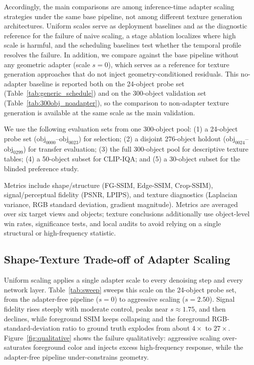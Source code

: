 \documentclass[times,twocolumn,final]{elsarticle}
\begin{document}
Accordingly, the main comparisons are among inference-time adapter scaling strategies under the same base pipeline, not among different texture generation architectures. Uniform scales serve as deployment baselines and as the diagnostic reference for the failure of naive scaling, a stage ablation localizes where high scale is harmful, and the scheduling baselines test whether the temporal profile resolves the failure. In addition, we compare against the base pipeline without any geometric adapter (scale $s=0$), which serves as a reference for texture generation approaches that do not inject geometry-conditioned residuals. This no-adapter baseline is reported both on the 24-object probe set (Table~\ref{tab:generic_schedule}) and on the 300-object validation set (Table~\ref{tab:300obj_noadapter}), so the comparison to non-adapter texture generation is available at the same scale as the main validation.

We use the following evaluation sets from one 300-object pool: (1) a 24-object probe set ($\mathrm{obj}_{0000}$--$\mathrm{obj}_{0023}$) for selection; (2) a disjoint 276-object holdout ($\mathrm{obj}_{0024}$--$\mathrm{obj}_{0299}$) for transfer evaluation; (3) the full 300-object pool for descriptive texture tables; (4) a 50-object subset for CLIP-IQA; and (5) a 30-object subset for the blinded preference study.

Metrics include shape/structure (FG-SSIM, Edge-SSIM, Crop-SSIM), signal/perceptual fidelity (PSNR, LPIPS), and texture diagnostics (Laplacian variance, RGB standard deviation, gradient magnitude). Metrics are averaged over six target views and objects; texture conclusions additionally use object-level win rates, significance tests, and local audits to avoid relying on a single structural or high-frequency statistic.

\subsection{Shape-Texture Trade-off of Adapter Scaling}
\label{subsec:tradeoff}

Uniform scaling applies a single adapter scale to every denoising step and every network layer. Table~\ref{tab:sweep} sweeps this scale on the 24-object probe set, from the adapter-free pipeline ($s = 0$) to aggressive scaling ($s = 2.50$). Signal fidelity rises steeply with moderate control, peaks near $s \approx 1.75$, and then declines, while foreground SSIM keeps collapsing and the foreground RGB-standard-deviation ratio to ground truth explodes from about $4\times$ to $27\times$. Figure~\ref{fig:qualitative} shows the failure qualitatively: aggressive scaling over-saturates foreground color and injects excess high-frequency response, while the adapter-free pipeline under-constrains geometry.
\end{document}
